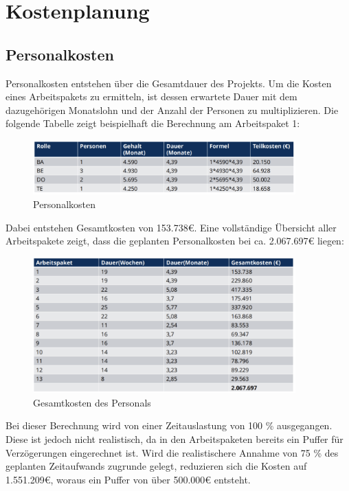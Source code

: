 \chapter{Kostenplanung}
\label{sec:kostenplanung}

\section{Personalkosten}
Personalkosten entstehen über die Gesamtdauer des Projekts. Um die Kosten eines Arbeitspakets zu ermitteln, ist dessen erwartete Dauer mit dem dazugehörigen Monatslohn und der Anzahl der Personen zu multiplizieren. Die folgende Tabelle zeigt beispielhaft die Berechnung am Arbeitspaket 1: 

\begin{figure}[ht]
	\centering
	\includegraphics[width=0.9\textwidth]{fig/Kosten1.png}
	\caption{Personalkosten}
	\label{fig:personalkosten}
\end{figure}
Dabei entstehen Gesamtkosten von 153.738€. Eine vollständige Übersicht aller Arbeitspakete zeigt, dass die geplanten Personalkosten bei ca. 2.067.697€ liegen:

\begin{figure}[ht]
	\centering
	\includegraphics[width=0.9\textwidth]{fig/Kosten2.png}
	\caption{Gesamtkosten des Personals}
	\label{fig:personalkosten_gesammt}
\end{figure}
\pagebreak
Bei dieser Berechnung wird von einer Zeitauslastung von 100 \% ausgegangen. Diese ist jedoch nicht realistisch, da in den Arbeitspaketen bereits ein Puffer für Verzögerungen eingerechnet ist. 
Wird die realistischere Annahme von 75 \% des geplanten Zeitaufwands zugrunde gelegt, reduzieren sich die Kosten auf 1.551.209€, woraus ein Puffer von über 500.000€ entsteht. 

